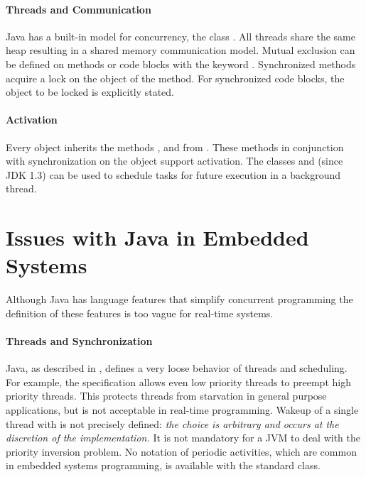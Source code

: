 \paragraph{Threads and Communication}

Java has a built-in model for concurrency, the class .
All threads share the same heap resulting in a shared memory
communication model. Mutual exclusion can be defined on methods or
code blocks with the keyword . Synchronized
methods acquire a lock on the object of the method. For synchronized
code blocks, the object to be locked is explicitly stated.


\paragraph{Activation}

Every object inherits the methods ,  and
 from . These methods in conjunction
with synchronization on the object support activation. The classes
 and  (since JDK
1.3) can be used to schedule tasks for future execution in a
background thread.

\section{Issues with Java in Embedded Systems}

Although Java has language features that simplify concurrent
programming the definition of these features is too vague for
real-time systems.


\paragraph{Threads and Synchronization}

Java, as described in \cite{JavaLangSpec2}, defines a very loose
behavior of threads and scheduling. For example, the specification
allows even low priority threads to preempt high priority threads.
This protects threads from starvation in general purpose
applications, but is not acceptable in real-time programming. Wakeup
of a single thread with  is not precisely defined:
\textit{the choice is arbitrary and occurs at the discretion of the
implementation.} It is not mandatory for a JVM to deal with the
priority inversion problem. No notation of periodic activities,
which are common in embedded systems programming, is available with
the standard  class.

